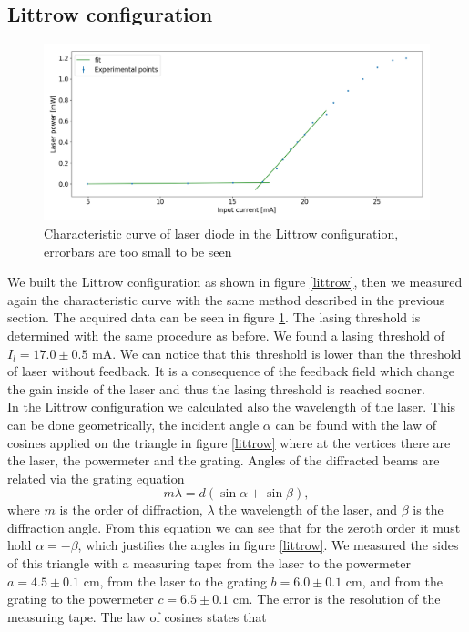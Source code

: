 \documentclass[a4paper,10pt]{article}
\begin{document}
\subsection{Littrow configuration}
\begin{figure}[H]
\centering
\includegraphics[width=\textwidth]{curvelittrow.png}
\caption{Characteristic curve of laser diode in the Littrow configuration, errorbars are too small to be seen}\label{littrowcurve}
\end{figure}
We built the Littrow configuration as shown in figure \ref{littrow}, then we measured again the characteristic curve with the same method described in the previous section. The acquired data can be seen in figure \ref{littrowcurve}. The lasing threshold is determined with the same procedure as before. We found a lasing threshold of $I_l =17.0 \pm 0.5$ mA. We can notice that this threshold is lower than the threshold of laser without feedback. It is a consequence of the feedback field which change the gain inside of the laser and thus the lasing threshold is reached sooner.\\
In the Littrow configuration we calculated also the wavelength of the laser. This can be done geometrically, the incident angle $\alpha$ can be found with the law of cosines applied on the triangle in figure \ref{littrow} where at the vertices there are the laser, the powermeter and the grating. Angles of the diffracted beams are related via the grating equation \cite{grating}
\begin{equation}\label{grating}m\lambda = d(\sin \alpha + \sin \beta),\end{equation}
where $m$ is the order of diffraction, $\lambda$ the wavelength of the laser, and $\beta$ is the diffraction angle. From this equation we can see that for the zeroth order it must hold $\alpha = -\beta$, which justifies the angles in figure \ref{littrow}. We measured the sides of this triangle with a measuring tape: from the laser to the powermeter $a = 4.5 \pm 0.1$ cm, from the laser to the grating $b = 6.0\pm 0.1$ cm, and from the grating to the powermeter $c = 6.5\pm 0.1$ cm. The error is the resolution of the measuring tape. The law of cosines states that
\end{document}
